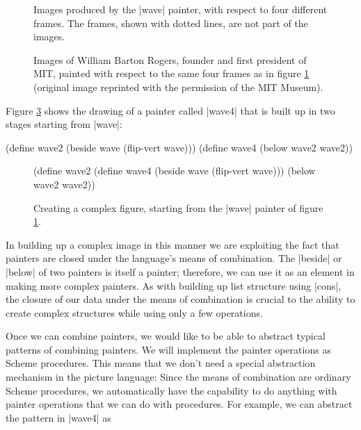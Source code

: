 \begin{Exercise}
\begin{Exercise}
\begin{Exercise}
\begin{figure}
\centering
\placeholder
\caption{Images produced by the \scheme|wave| painter, with respect to
  four different frames.  The frames, shown with dotted lines, are not
  part of the images.}
\label{fig:2.10}
\end{figure}

\begin{figure}
  \centering
  \placeholder
  \caption{Images of William Barton Rogers, founder and first
    president of MIT, painted with respect to the same four frames as
    in figure \ref{fig:2.10} (original image reprinted with the
    permission of the MIT Museum).}
  \label{fig:2.11}
\end{figure}


Figure \ref{fig:2.12} shows the drawing of a painter called
\scheme|wave4| that is built up in two stages starting from \scheme|wave|:
\begin{schemedisplay}
(define wave2 (beside wave (flip-vert wave)))
(define wave4 (below wave2 wave2))
\end{schemedisplay}

\begin{figure}
  \centering
\placeholder
  \begin{schemedisplay}
    (define wave2                         (define wave4
      (beside wave (flip-vert wave)))       (below wave2 wave2))
  \end{schemedisplay}
  \caption{Creating a complex figure, starting from the \scheme|wave| painter of figure \ref{fig:2.10}.}
  \label{fig:2.12}
\end{figure}

In building up a complex image in this manner we are exploiting the
fact that painters are closed under the language's means of
combination.  The \scheme|beside| or \scheme|below| of two painters is
itself a painter; therefore, we can use it as an element in making
more complex painters.  As with building up list structure using \scheme|cons|, the closure of our data under the means of combination is
crucial to the ability to create complex structures while using only a
few operations.


Once we can combine painters, we would like to be able to abstract
typical patterns of combining painters.
We will implement the painter operations as Scheme procedures.
This means that we don't need a special abstraction mechanism
in the picture language:
Since the means of combination
are ordinary Scheme procedures, we automatically have the capability
to do anything with painter operations that we can do with
procedures.
For example, we can abstract the pattern in \scheme|wave4| as



\end{Exercise}
\end{Exercise}
\end{Exercise}
